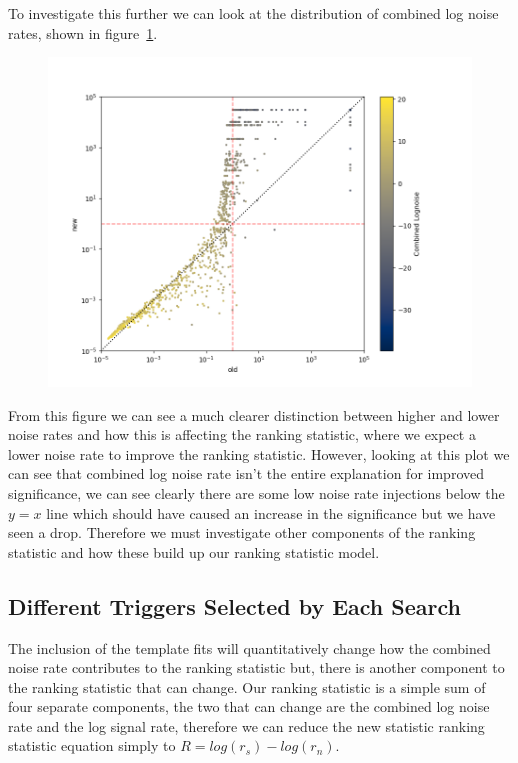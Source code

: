 To investigate this further we can look at the distribution of combined log noise rates, shown in figure~\ref{fig:pycbclive-ifar-ifar-comb-log-noise-rate}.
%
\begin{figure}
  \centering
  \includegraphics[width=1\textwidth]{images/pycbclive/all_full_comb_lognoise.png}
  \caption{}
  \label{fig:pycbclive-ifar-ifar-comb-log-noise-rate}
\end{figure}
%
From this figure we can see a much clearer distinction between higher and lower noise rates and how this is affecting the ranking statistic, where we expect a lower noise rate to improve the ranking statistic. However, looking at this plot we can see that combined log noise rate isn't the entire explanation for improved significance, we can see clearly there are some low noise rate injections below the $y=x$ line which should have caused an increase in the significance but we have seen a drop. Therefore we must investigate other components of the ranking statistic and how these build up our ranking statistic model.

\subsection{\label{sec:pycbclive-diff-triggers}Different Triggers Selected by Each Search}


The inclusion of the template fits will quantitatively change how the combined noise rate contributes to the ranking statistic but, there is another component to the ranking statistic that can change. Our ranking statistic is a simple sum of four separate components, the two that can change are the combined log noise rate and the log signal rate, therefore we can reduce the new statistic ranking statistic equation simply to $R = log(r_s) - log(r_n)$.

